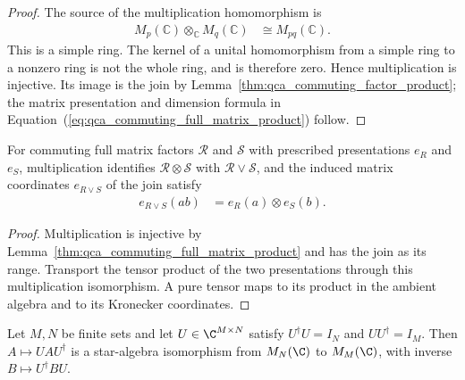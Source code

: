 \begin{proof}\leanok
    The source of the multiplication homomorphism is
    \begin{align}
        M_p(\mathbb C)\otimes_{\mathbb C}M_q(\mathbb C)
         & \cong M_{pq}(\mathbb C).
    \end{align}
    This is a simple ring.  The kernel of a unital homomorphism from a
    simple ring to a nonzero ring is not the whole ring, and is therefore
    zero.  Hence multiplication is injective.  Its image is the join by
    Lemma~\ref{thm:qca_commuting_factor_product}; the matrix presentation
    and dimension formula in
    Equation~(\ref{eq:qca_commuting_full_matrix_product}) follow.
\end{proof}

\begin{lemma}
    \label{lem:commuting_product_coordinates}
    \leanok
    For commuting full matrix factors $\mathcal R$ and $\mathcal S$ with
    prescribed presentations $e_R$ and $e_S$, multiplication identifies
    $\mathcal R\otimes\mathcal S$ with $\mathcal R\vee\mathcal S$, and the
    induced matrix coordinates $e_{R\vee S}$ of the join satisfy
    \begin{align}
        e_{R\vee S}(ab) & =e_R(a)\otimes e_S(b).
    \end{align}
\end{lemma}

\begin{proof}
    \leanok
    Multiplication is injective by
    Lemma~\ref{thm:qca_commuting_full_matrix_product} and has the join as its
    range. Transport the tensor product of the two presentations through this
    multiplication isomorphism. A pure tensor maps to its product in the
    ambient algebra and to its Kronecker coordinates.
\end{proof}

\begin{definition}
    \label{def:rectangular_unitary_conjugation}
    \leanok
    Let $M,N$ be finite sets and let $U\in\C^{M\times N}$ satisfy
    $U^\dagger U=I_N$ and $UU^\dagger=I_M$. Then $A\mapsto UAU^\dagger$ is a
    star-algebra isomorphism from $M_N(\C)$ to $M_M(\C)$, with inverse
    $B\mapsto U^\dagger BU$.
\end{definition}

